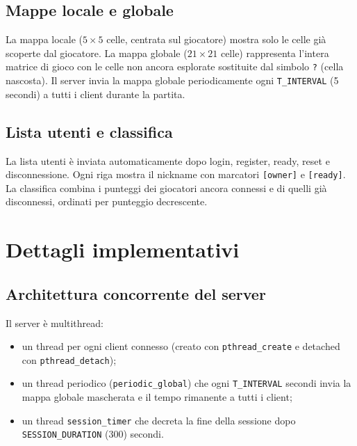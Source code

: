 \documentclass[a4paper,11pt]{article}
\begin{document}
\subsection{Mappe locale e globale}

La mappa locale ($5\times5$ celle, centrata sul giocatore) mostra solo le
celle già scoperte dal giocatore. La mappa globale ($21\times21$ celle)
rappresenta l'intera matrice di gioco con le celle non ancora esplorate
sostituite dal simbolo \texttt{?} (cella nascosta). Il server invia la mappa
globale periodicamente ogni \texttt{T\_INTERVAL} (5 secondi) a tutti i client
durante la partita.

\subsection{Lista utenti e classifica}

La lista utenti è inviata automaticamente dopo login, register, ready, reset e
disconnessione. Ogni riga mostra il nickname con marcatori \texttt{[owner]} e
\texttt{[ready]}. La classifica combina i punteggi dei giocatori ancora connessi
e di quelli già disconnessi, ordinati per punteggio decrescente.

\section{Dettagli implementativi}

\subsection{Architettura concorrente del server}

Il server è multithread:
\begin{itemize}[topsep=0.3em]
    \item un thread per ogni client connesso (creato con \texttt{pthread\_create}
          e detached con \texttt{pthread\_detach});
    \item un thread periodico (\texttt{periodic\_global}) che ogni
          \texttt{T\_INTERVAL} secondi invia la mappa globale mascherata e il
          tempo rimanente a tutti i client;
    \item un thread \texttt{session\_timer} che decreta la fine della sessione
          dopo \texttt{SESSION\_DURATION} (300) secondi.
\end{itemize}
\end{document}
